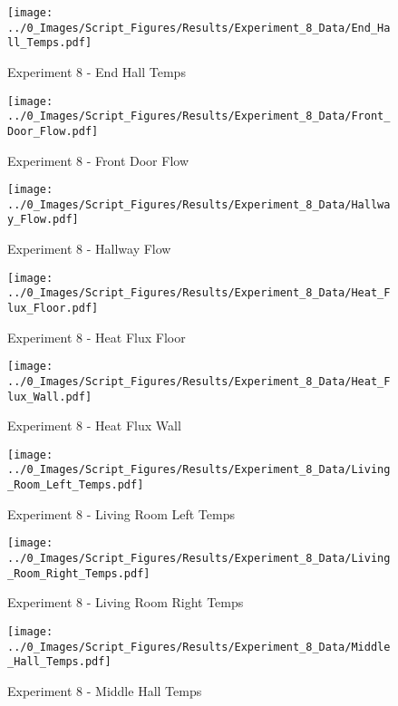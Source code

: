 	\begin{figure}[H]
		\centering
		\texttt{[image: ../0\_Images/Script\_Figures/Results/Experiment\_8\_Data/End\_Hall\_Temps.pdf]}
		\caption[]{Experiment 8 - End Hall Temps}
	\end{figure}
 
	\clearpage

	\begin{figure}[H]
		\centering
		\texttt{[image: ../0\_Images/Script\_Figures/Results/Experiment\_8\_Data/Front\_Door\_Flow.pdf]}
		\caption[]{Experiment 8 - Front Door Flow}
	\end{figure}
 

	\begin{figure}[H]
		\centering
		\texttt{[image: ../0\_Images/Script\_Figures/Results/Experiment\_8\_Data/Hallway\_Flow.pdf]}
		\caption[]{Experiment 8 - Hallway Flow}
	\end{figure}
 
	\clearpage

	\begin{figure}[H]
		\centering
		\texttt{[image: ../0\_Images/Script\_Figures/Results/Experiment\_8\_Data/Heat\_Flux\_Floor.pdf]}
		\caption[]{Experiment 8 - Heat Flux Floor}
	\end{figure}
 

	\begin{figure}[H]
		\centering
		\texttt{[image: ../0\_Images/Script\_Figures/Results/Experiment\_8\_Data/Heat\_Flux\_Wall.pdf]}
		\caption[]{Experiment 8 - Heat Flux Wall}
	\end{figure}
 
	\clearpage

	\begin{figure}[H]
		\centering
		\texttt{[image: ../0\_Images/Script\_Figures/Results/Experiment\_8\_Data/Living\_Room\_Left\_Temps.pdf]}
		\caption[]{Experiment 8 - Living Room Left Temps}
	\end{figure}
 

	\begin{figure}[H]
		\centering
		\texttt{[image: ../0\_Images/Script\_Figures/Results/Experiment\_8\_Data/Living\_Room\_Right\_Temps.pdf]}
		\caption[]{Experiment 8 - Living Room Right Temps}
	\end{figure}
 
	\clearpage

	\begin{figure}[H]
		\centering
		\texttt{[image: ../0\_Images/Script\_Figures/Results/Experiment\_8\_Data/Middle\_Hall\_Temps.pdf]}
		\caption[]{Experiment 8 - Middle Hall Temps}
	\end{figure}
 

